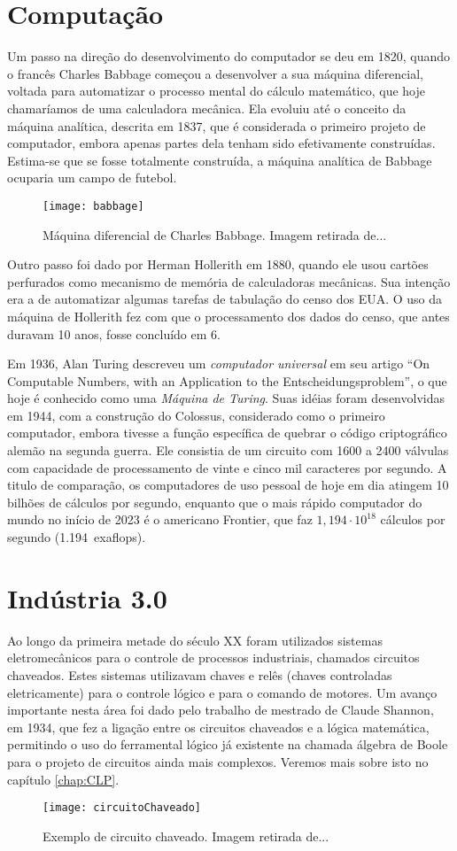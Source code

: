 \section{Computação}
Um passo na direção do desenvolvimento do computador se deu em 1820, quando o francês Charles Babbage começou a desenvolver a sua máquina diferencial, voltada para automatizar o processo mental do cálculo matemático, que hoje chamaríamos de uma calculadora mecânica. Ela evoluiu até o conceito da máquina analítica, descrita em 1837, que é considerada o primeiro projeto de computador, embora apenas partes dela tenham sido efetivamente construídas. Estima-se que se fosse totalmente construída, a máquina analítica de Babbage ocuparia um campo de futebol.
\begin{figure}
  \centering
  \texttt{[image: babbage]}
  \caption{Máquina diferencial de Charles Babbage. Imagem retirada de...}
\end{figure}

Outro passo foi dado por Herman Hollerith em 1880, quando ele usou cartões perfurados como mecanismo de memória de calculadoras mecânicas. Sua intenção era a de automatizar algumas tarefas de tabulação do censo dos EUA. O uso da máquina de Hollerith fez com que o processamento dos dados do censo, que antes duravam 10 anos, fosse concluído em 6.

Em 1936, Alan Turing descreveu um \emph{computador universal} em seu artigo “On Computable Numbers, with an Application to the Entscheidungsproblem”, o que hoje é conhecido como uma \emph{Máquina de Turing}. Suas idéias foram desenvolvidas em 1944, com a construção do Colossus, considerado como o primeiro computador, embora tivesse a função específica de quebrar o código criptográfico alemão na segunda guerra. Ele consistia de um circuito com 1600 a 2400 válvulas com capacidade de processamento de vinte e cinco mil caracteres por segundo. A titulo de comparação, os computadores de uso pessoal de hoje em dia atingem 10 bilhões de cálculos por segundo, enquanto que o mais rápido computador do mundo no início de 2023 é o americano Frontier, que faz $1,194\cdot10^{18}$ cálculos por segundo (\SI{1,194}{exaflops}).

\section{Indústria 3.0}
Ao longo da primeira metade do século XX foram utilizados sistemas eletromecânicos para o controle de processos industriais, chamados circuitos chaveados. Estes sistemas utilizavam chaves e relês (chaves controladas eletricamente) para o controle lógico e para o comando de motores. Um avanço importante nesta área foi dado pelo trabalho de mestrado de Claude Shannon, em 1934, que fez a ligação entre os circuitos chaveados e a lógica matemática, permitindo o uso do ferramental lógico já existente na chamada álgebra de Boole para o projeto de circuitos ainda mais complexos. Veremos mais sobre isto no capítulo \ref{chap:CLP}.
\begin{figure}
  \centering
  \texttt{[image: circuitoChaveado]}
  \caption{Exemplo de circuito chaveado. Imagem retirada de...}
\end{figure}

